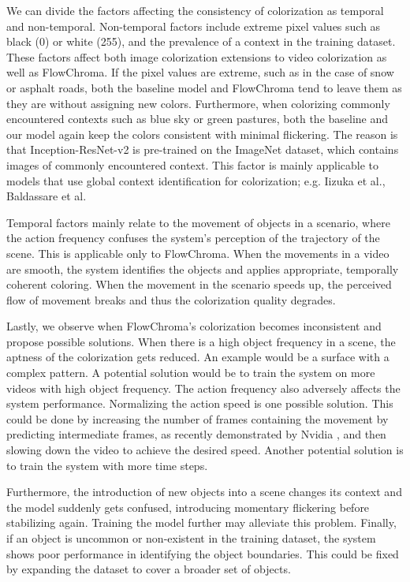 \documentclass[10pt,twocolumn,letterpaper]{article}
\begin{document}
We can divide the factors affecting the consistency of colorization as temporal and non-temporal. Non-temporal factors include extreme pixel values such as black (0) or white (255), and the prevalence of a context in the training dataset. These factors affect both image colorization extensions to video colorization as well as FlowChroma. If the pixel values are extreme, such as in the case of snow or asphalt roads, both the baseline model and FlowChroma tend to leave them as they are without assigning new colors. Furthermore, when colorizing commonly encountered contexts such as blue sky or green pastures, both the baseline and our model again keep the colors consistent with minimal flickering. The reason is that Inception-ResNet-v2 is pre-trained on the ImageNet dataset, which contains  images of commonly encountered context. This factor is mainly applicable to models that use global context identification for colorization; e.g. Iizuka et al., Baldassare et al.

Temporal factors mainly relate to the movement of objects in a scenario, where the action frequency confuses the system's perception of the trajectory of the scene. This is applicable only to FlowChroma. When the movements in a video are smooth, the system identifies the objects and applies appropriate, temporally coherent coloring. When the movement in the scenario speeds up, the perceived flow of movement breaks and thus the colorization quality degrades.

Lastly, we observe when FlowChroma’s colorization becomes inconsistent and propose possible solutions. When there is a high object frequency in a scene, the aptness of the colorization gets reduced. An example would be a surface with a complex pattern. A potential solution would be to train the system on more videos with high object frequency. The action frequency also adversely affects the system performance. Normalizing the action speed is one possible solution. This could be done by increasing the number of frames containing the movement by predicting intermediate frames, as recently demonstrated by Nvidia \cite{DBLP:journals/corr/abs-1712-00080}, and then slowing down the video to achieve the desired speed. Another potential solution is to train the system with more time steps. 

Furthermore, the introduction of new objects into a scene changes its context and the model suddenly gets confused, introducing momentary flickering before stabilizing again. Training the model further may alleviate this problem. Finally, if an object is uncommon or non-existent in the training dataset, the system shows poor performance in identifying the object boundaries. This could be fixed by expanding the dataset to cover a broader set of objects.
\end{document}
